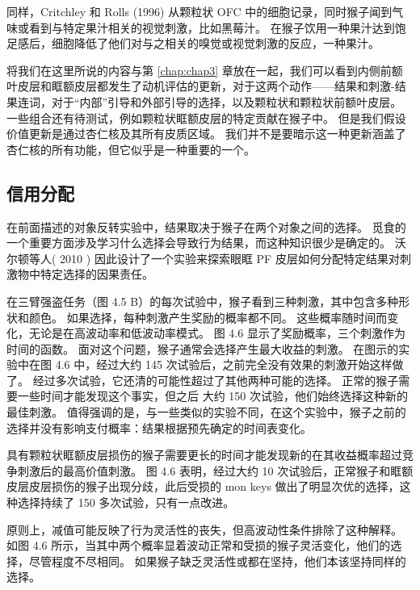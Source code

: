 同样，Critchley 和 Rolls (1996) 从颗粒状 OFC 中的细胞记录，同时猴子闻到气味或看到与特定果汁相关的视觉刺激，比如黑莓汁。
在猴子饮用一种果汁达到饱足感后，细胞降低了他们对与之相关的嗅觉或视觉刺激的反应，一种果汁。\par


将我们在这里所说的内容与第 \ref{chap:chap3} 章放在一起，我们可以看到内侧前额叶皮层和眶额皮层都发生了动机评估的更新，对于这两个动作——结果和刺激-结果连词，对于“内部”引导和外部引导的选择，以及颗粒状和颗粒状前额叶皮层。
一些组合还有待测试，例如颗粒状眶额皮层的特定贡献在猴子中。
但是我们假设价值更新是通过杏仁核及其所有皮质区域。 我们并不是要暗示这一种更新涵盖了杏仁核的所有功能，但它似乎是一种重要的一个。\par



\subsection{信用分配}

在前面描述的对象反转实验中，结果取决于猴子在两个对象之间的选择。
觅食的一个重要方面涉及学习什么选择会导致行为结果，而这种知识很少是确定的。
沃尔顿等人( 2010 ) 因此设计了一个实验来探索眼眶 PF 皮层如何分配特定结果对刺激物中特定选择的因果责任。\par


在三臂强盗任务（图 4.5 B）的每次试验中，猴子看到三种刺激，其中包含多种形状和颜色。
如果选择，每种刺激产生奖励的概率都不同。
这些概率随时间而变化，无论是在高波动率和低波动率模式。
图 4.6 显示了奖励概率，三个刺激作为时间的函数。
面对这个问题，猴子通常会选择产生最大收益的刺激。
在图示的实验中在图 4.6 中，经过大约 145 次试验后，之前完全没有效果的刺激开始这样做了。
经过多次试验，它还清的可能性超过了其他两种可能的选择。
正常的猴子需要一些时间才能发现这个事实，但之后
大约 150 次试验，他们始终选择这种新的最佳刺激。
值得强调的是，与一些类似的实验不同，在这个实验中，猴子之前的选择并没有影响支付概率：结果根据预先确定的时间表变化。\par


具有颗粒状眶额皮层损伤的猴子需要更长的时间才能发现新的在其收益概率超过竞争刺激后的最高价值刺激。
图 4.6 表明，经过大约 10 次试验后，正常猴子和眶额皮层皮层损伤的猴子出现分歧，此后受损的 mon keys 做出了明显次优的选择，这种选择持续了 150 多次试验，只有一点改进。\par


原则上，减值可能反映了行为灵活性的丧失，但高波动性条件排除了这种解释。
如图 4.6 所示，当其中两个概率显着波动正常和受损的猴子灵活变化，他们的选择，尽管程度不尽相同。
如果猴子缺乏灵活性或都在坚持，他们本该坚持同样的选择。\par


